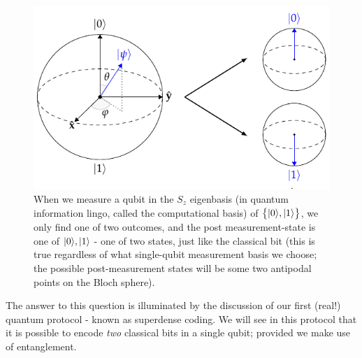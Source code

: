 \begin{figure}[htbp]
    \centering
    \includegraphics{Images/fig-qubitmeasurement.pdf}
    

    \caption{When we measure a qubit in the $S_z$ eigenbasis (in quantum information lingo, called the computational basis) of $\set{\lvert 0 \rangle, \lvert 1 \rangle}$, we only find one of two outcomes, and the post measurement-state is one of $\lvert 0 \rangle, \lvert 1 \rangle$ - one of two states, just like the classical bit (this is true regardless of what single-qubit measurement basis we choose; the possible post-measurement states will be some two antipodal points on the Bloch sphere).}
    \label{fig-qubitmeasurement}
\end{figure}

The answer to this question is illuminated by the discussion of our first (real!) quantum protocol - known as superdense coding. We will see in this protocol that it is possible to encode \emph{two} classical bits in a single qubit; provided we make use of entanglement. 

